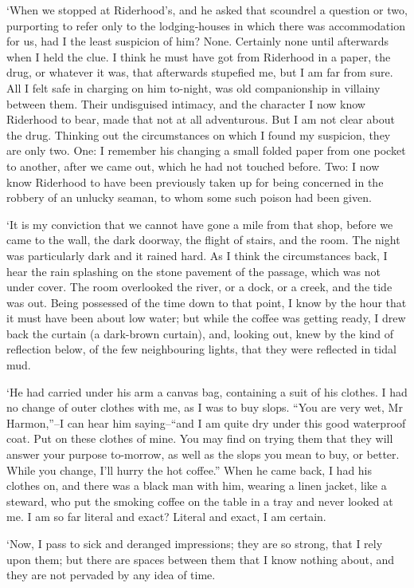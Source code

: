 ‘When we stopped at Riderhood’s, and he asked that scoundrel a question
or two, purporting to refer only to the lodging-houses in which there
was accommodation for us, had I the least suspicion of him? None.
Certainly none until afterwards when I held the clue. I think he must
have got from Riderhood in a paper, the drug, or whatever it was, that
afterwards stupefied me, but I am far from sure. All I felt safe in
charging on him to-night, was old companionship in villainy between
them. Their undisguised intimacy, and the character I now know Riderhood
to bear, made that not at all adventurous. But I am not clear about the
drug. Thinking out the circumstances on which I found my suspicion, they
are only two. One: I remember his changing a small folded paper from one
pocket to another, after we came out, which he had not touched before.
Two: I now know Riderhood to have been previously taken up for being
concerned in the robbery of an unlucky seaman, to whom some such poison
had been given.

‘It is my conviction that we cannot have gone a mile from that shop,
before we came to the wall, the dark doorway, the flight of stairs, and
the room. The night was particularly dark and it rained hard. As I think
the circumstances back, I hear the rain splashing on the stone pavement
of the passage, which was not under cover. The room overlooked the
river, or a dock, or a creek, and the tide was out. Being possessed of
the time down to that point, I know by the hour that it must have been
about low water; but while the coffee was getting ready, I drew back the
curtain (a dark-brown curtain), and, looking out, knew by the kind
of reflection below, of the few neighbouring lights, that they were
reflected in tidal mud.

‘He had carried under his arm a canvas bag, containing a suit of his
clothes. I had no change of outer clothes with me, as I was to buy
slops. “You are very wet, Mr Harmon,”--I can hear him saying--“and I am
quite dry under this good waterproof coat. Put on these clothes of
mine. You may find on trying them that they will answer your purpose
to-morrow, as well as the slops you mean to buy, or better. While you
change, I’ll hurry the hot coffee.” When he came back, I had his clothes
on, and there was a black man with him, wearing a linen jacket, like
a steward, who put the smoking coffee on the table in a tray and never
looked at me. I am so far literal and exact? Literal and exact, I am
certain.

‘Now, I pass to sick and deranged impressions; they are so strong, that
I rely upon them; but there are spaces between them that I know nothing
about, and they are not pervaded by any idea of time.

